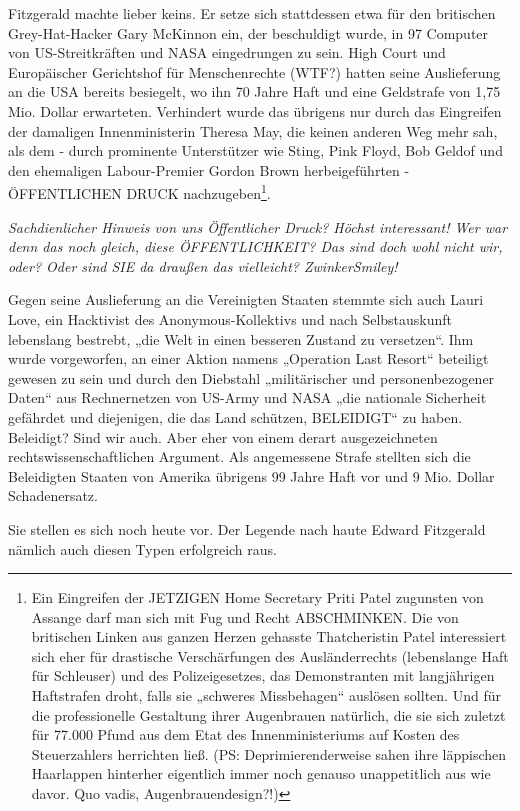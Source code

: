 \begin{multicols}{2}
Fitzgerald machte lieber keins. Er setze sich stattdessen
etwa für den britischen Grey-Hat-Hacker Gary McKinnon ein, der beschuldigt wurde, in 97 Computer von
US-Streitkräften und NASA eingedrungen zu sein. High
Court und Europäischer Gerichtshof für Menschenrechte (WTF?) hatten seine Auslieferung an die USA bereits
besiegelt, wo ihn 70 Jahre Haft und eine Geldstrafe von
1,75 Mio. Dollar erwarteten. Verhindert wurde das übrigens nur durch das Eingreifen der damaligen Innenministerin Theresa May, die keinen anderen Weg mehr sah,
als dem - durch prominente Unterstützer wie Sting, Pink
Floyd, Bob Geldof und den ehemaligen Labour-Premier Gordon Brown herbeigeführten - ÖFFENTLICHEN
DRUCK nachzugeben\footnote[13]{Ein Eingreifen der JETZIGEN Home Secretary Priti Patel zugunsten von Assange darf man sich mit Fug und
Recht ABSCHMINKEN. Die von britischen Linken aus ganzen Herzen gehasste Thatcheristin Patel interessiert
sich eher für drastische Verschärfungen des Ausländerrechts (lebenslange Haft für Schleuser) und des Polizeigesetzes, das Demonstranten mit langjährigen Haftstrafen droht, falls sie „schweres Missbehagen“ auslösen
sollten. Und für die professionelle Gestaltung ihrer Augenbrauen natürlich, die sie sich zuletzt für 77.000 Pfund
aus dem Etat des Innenministeriums auf Kosten des Steuerzahlers herrichten ließ.
(PS: Deprimierenderweise sahen ihre läppischen Haarlappen hinterher eigentlich immer noch genauso unappetitlich aus wie davor. Quo vadis, Augenbrauendesign?!)}.

\textit{Sachdienlicher Hinweis von uns
Öffentlicher Druck? Höchst interessant! Wer war denn
das noch gleich, diese ÖFFENTLICHKEIT? Das sind doch
wohl nicht wir, oder? Oder sind SIE da draußen das vielleicht? ZwinkerSmiley!}

Gegen seine Auslieferung an die Vereinigten Staaten
stemmte sich auch Lauri Love, ein Hacktivist des Anonymous-Kollektivs und nach Selbstauskunft lebenslang
bestrebt, „die Welt in einen besseren Zustand zu versetzen“. Ihm wurde vorgeworfen, an einer Aktion namens
„Operation Last Resort“ beteiligt gewesen zu sein und
durch den Diebstahl „militärischer und personenbezogener Daten“ aus Rechnernetzen von US-Army und
NASA „die nationale Sicherheit gefährdet und diejenigen, die das Land schützen, BELEIDIGT“ zu haben. Beleidigt? Sind wir auch. Aber eher von einem derart ausgezeichneten rechtswissenschaftlichen Argument. Als
angemessene Strafe stellten sich die Beleidigten Staaten
von Amerika übrigens 99 Jahre Haft vor und 9 Mio. Dollar Schadenersatz.

Sie stellen es sich noch heute vor. Der Legende nach
haute Edward Fitzgerald nämlich auch diesen Typen erfolgreich raus.



\end{multicols}
